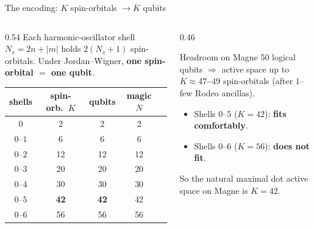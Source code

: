 \documentclass[aspectratio=169,11pt]{beamer}
\begin{document}
\begin{frame}{The encoding: $K$ spin-orbitals $\to K$ qubits}
\begin{columns}[T]
\begin{column}{0.54\textwidth}
Each harmonic-oscillator shell $N_s=2n+|m|$ holds $2(N_s{+}1)$ spin-orbitals.
Under Jordan--Wigner, \textbf{one spin-orbital $=$ one qubit}.
\vspace{4pt}
\begin{center}\small
\renewcommand{\arraystretch}{1.15}
\begin{tabular}{@{}ccccc@{}}
\toprule
shells & spin-orb.\ $K$ & \textbf{qubits} & magic $N$ \\
\midrule
$0$       & 2  & 2  & 2 \\
$0$--$1$  & 6  & 6  & 6 \\
$0$--$2$  & 12 & 12 & 12 \\
$0$--$3$  & 20 & 20 & 20 \\
$0$--$4$  & 30 & 30 & 30 \\
$0$--$5$  & \textbf{42} & \textbf{42} & 42 \\
$0$--$6$  & 56 & \alert{56} & 56 \\
\bottomrule
\end{tabular}
\end{center}
\end{column}
\begin{column}{0.46\textwidth}
\begin{block}{Headroom on Magne}
50 logical qubits $\Rightarrow$ active space up to \textbf{$K\approx47$--$49$}
spin-orbitals (after $1$--few Rodeo ancillas).
\begin{itemize}\small
  \item Shells $0$--$5$ ($K=42$): \textbf{fits comfortably}.
  \item Shells $0$--$6$ ($K=56$): \textbf{does not fit}.
\end{itemize}
So the natural maximal dot active space on Magne is \textbf{$K=42$}.
\end{block}
\end{column}
\end{columns}
\end{frame}
\end{document}
